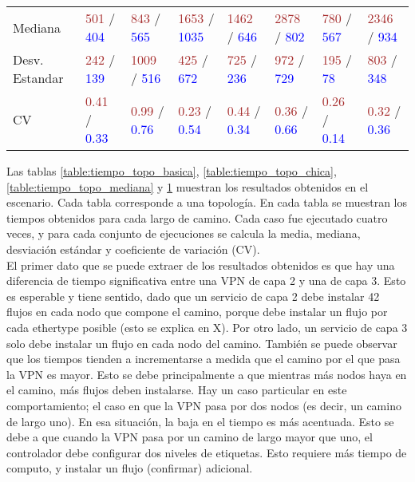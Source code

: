 \begin{table}[!h]
\begin{tabular}{p{2.2cm} p{1.4cm} p{1.4cm} p{1.4cm} p{1.4cm} p{1.4cm} p{1.4cm} p{1.4cm}}
		Mediana & \textcolor{brown}{501} / \textcolor{blue}{404} & \textcolor{brown}{843} / \textcolor{blue}{565} & \textcolor{brown}{1653} / \textcolor{blue}{1035} & \textcolor{brown}{1462} / \textcolor{blue}{646} & \textcolor{brown}{2878} / \textcolor{blue}{802} & \textcolor{brown}{780} / \textcolor{blue}{567} & \textcolor{brown}{2346} / \textcolor{blue}{934} \\
		Desv. Estandar & \textcolor{brown}{242} / \textcolor{blue}{139} & \textcolor{brown}{1009} / \textcolor{blue}{516} & \textcolor{brown}{425} / \textcolor{blue}{672} & \textcolor{brown}{725} / \textcolor{blue}{236} & \textcolor{brown}{972} / \textcolor{blue}{729} & \textcolor{brown}{195} / \textcolor{blue}{78} & \textcolor{brown}{803} / \textcolor{blue}{348} \\
		CV & \textcolor{brown}{0.41} / \textcolor{blue}{0.33} & \textcolor{brown}{0.99} / \textcolor{blue}{0.76} & \textcolor{brown}{0.23} / \textcolor{blue}{0.54} & \textcolor{brown}{0.44} / \textcolor{blue}{0.34} & \textcolor{brown}{0.36} / \textcolor{blue}{0.66} & \textcolor{brown}{0.26} / \textcolor{blue}{0.14} & \textcolor{brown}{0.32} / \textcolor{blue}{0.36} \\ [1ex]
		\hline
	\end{tabular}
	\label{table:tiempo_topo_grande}
\end{table}


Las tablas \ref{table:tiempo_topo_basica}, \ref{table:tiempo_topo_chica}, \ref{table:tiempo_topo_mediana} y \ref{table:tiempo_topo_grande} muestran los resultados obtenidos en el escenario. Cada tabla corresponde a una topología. En cada tabla se muestran los tiempos obtenidos para cada largo de camino. Cada caso fue ejecutado cuatro veces, y para cada conjunto de ejecuciones se calcula la media, mediana, desviación estándar y coeficiente de variación (CV). \\

El primer dato que se puede extraer de los resultados obtenidos es que hay una diferencia de tiempo significativa entre una VPN de capa 2 y una de capa 3. Esto es esperable y tiene sentido, dado que un servicio de capa 2 debe instalar 42 flujos en cada nodo que compone el camino, porque debe instalar un flujo por cada ethertype posible (esto se explica en X). Por otro lado, un servicio de capa 3 solo debe instalar un flujo en cada nodo del camino.
También se puede observar que los tiempos tienden a incrementarse a medida que el camino por el que pasa la VPN es mayor. Esto se debe principalmente a que mientras más nodos haya en el camino, más flujos deben instalarse. Hay un caso particular en este comportamiento; el caso en que la VPN pasa por dos nodos (es decir, un camino de largo uno). En esa situación, la baja en el tiempo es más acentuada. Esto se debe a que cuando la VPN pasa por un camino de largo mayor que uno, el controlador debe configurar dos niveles de etiquetas. Esto requiere más tiempo de computo, y instalar un flujo (confirmar) adicional.

